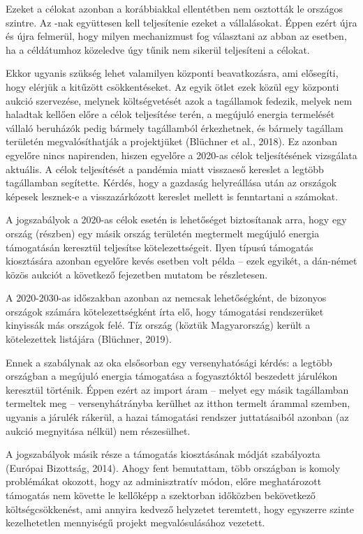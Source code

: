 \documentclass[twoside, magyar, showtrims]{corvinusphd}
\begin{document}
Ezeket a célokat azonban a korábbiakkal
ellentétben nem osztották le országos szintre.
Az -nak együttesen kell teljesítenie ezeket a vállalásokat.
Éppen ezért újra és újra felmerül,
hogy milyen mechanizmust fog választani
az  abban az esetben, ha a céldátumhoz közeledve
úgy tűnik nem sikerül teljesíteni a célokat.

Ekkor ugyanis szükség lehet valamilyen
központi beavatkozásra, ami elősegíti, hogy
elérjük a kitűzött csökkentéseket. Az egyik
ötlet ezek közül egy központi aukció szervezése,
melynek költségvetését azok a tagállamok fedezik,
melyek nem haladtak  kellően előre a célok teljesítése terén,
a megújuló energia termelését vállaló
beruházók pedig bármely tagállamból érkezhetnek,
és bármely tagállam területén megvalósíthatják
a projektjüket (Blüchner et al., 2018).
Ez azonban egyelőre nincs napirenden, hiszen egyelőre
a 2020-as célok teljesítésének vizsgálata aktuális.
A célok teljesítését a pandémia miatt visszaeső
kereslet a legtöbb tagállamban segítette.
Kérdés, hogy a gazdaság helyreállása után
az országok képesek lesznek-e a visszazárkózott
kereslet mellett is fenntartani a számokat.

A jogszabályok a 2020-as célok esetén
is lehetőséget biztosítanak arra, hogy egy ország
(részben) egy másik ország területén megtermelt
megújuló energia támogatásán keresztül
teljesítse kötelezettségeit. Ilyen típusú támogatás
kiosztására azonban egyelőre kevés esetben
volt példa -- ezek egyikét, a dán-német közös aukciót
a következő fejezetben mutatom be részletesen.

A 2020-2030-as időszakban azonban
az  nemcsak lehetőségként, de bizonyos
országok számára kötelezettségként írta elő,
hogy támogatási rendszerüket kinyissák más országok felé.
Tíz ország (köztük Magyarország) került
a kötelezettek listájára (Blüchner, 2019).

Ennek a szabálynak az oka elsősorban egy versenyhatósági kérdés:
a legtöbb országban a megújuló energia támogatása
a fogyasztóktól beszedett járulékon keresztül történik.
Éppen ezért az import áram -- melyet egy másik
tagállamban termeltek meg -- versenyhátrányba kerülhet az itthon
termelt árammal szemben, ugyanis a járulék rákerül,
a hazai támogatási rendszer juttatásaiból azonban
(az aukció megnyitása nélkül) nem részesülhet.

A jogszabályok másik része a támogatás
kiosztásának módját szabályozta
(Európai Bizottság, 2014). Ahogy fent bemutattam,
több országban is komoly problémákat okozott,
hogy az adminisztratív módon, előre meghatározott támogatás
nem követte le kellőképp a szektorban
időközben bekövetkező költségcsökkenést,
ami annyira kedvező helyzetet teremtett,
hogy egyszerre szinte kezelhetetlen
mennyiségű projekt megvalósulásához vezetett. 
\end{document}
